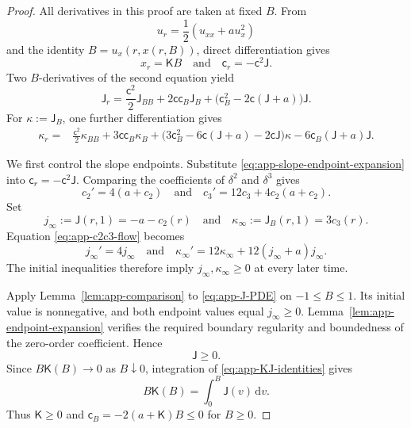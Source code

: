 \documentclass[10pt]{amsart}
\theoremstyle{definition}
\theoremstyle{remark}
\numberwithin{equation}{section}
\newcommand{\1}{\mathbf 1}
\newcommand{\dd}{\,\mathrm d}
\begin{document}
\begin{proof}
All derivatives in this proof are taken at fixed $B$.  From
\begin{equation*}
 u_r=\frac12(u_{xx}+au_x^2)
\end{equation*}
and the identity $B=u_x(r,x(r,B))$, direct differentiation gives
\begin{equation}
 x_r=\mathsf K B\quad\text{and}\quad \mathsf c_r=-\mathsf c^2\mathsf J.
 \label{eq:app-xC-flow}
\end{equation}
Two $B$-derivatives of the second equation yield
\begin{equation}
 \mathsf J_r=\frac{\mathsf c^2}{2}\mathsf J_{BB}+2\mathsf c\mathsf c_B\mathsf J_B
 +\bigl(\mathsf c_B^2-2\mathsf c(\mathsf J+a)\bigr)\mathsf J.
 \label{eq:app-J-PDE}
\end{equation}
For $\kappa:=\mathsf J_B$, one further differentiation gives
\begin{align}
 \kappa_r=&\frac{\mathsf c^2}{2}\kappa_{BB}+3\mathsf c\mathsf c_B\kappa_B
 +\bigl(3\mathsf c_B^2-6\mathsf c(\mathsf J+a)-2\mathsf c\mathsf J\bigr)\kappa
 -6\mathsf c_B(\mathsf J+a)\mathsf J.
 \label{eq:app-kappa-PDE}
\end{align}

We first control the slope endpoints.  Substitute \eqref{eq:app-slope-endpoint-expansion} into $\mathsf c_r=-\mathsf c^2\mathsf J$.  Comparing the coefficients of $\delta^2$ and $\delta^3$ gives
\begin{equation}
 c_2'=4(a+c_2)\quad\text{and}\quad
 c_3'=12c_3+4c_2(a+c_2).
 \label{eq:app-c2c3-flow}
\end{equation}
Set
\begin{equation*}
 j_\infty:=\mathsf J(r,1)=-a-c_2(r)\quad\text{and}\quad
 \kappa_\infty:=\mathsf J_B(r,1)=3c_3(r).
\end{equation*}
Equation \eqref{eq:app-c2c3-flow} becomes
\begin{equation}
 j_\infty'=4j_\infty\quad\text{and}\quad
 \kappa_\infty'=12\kappa_\infty
 +12(j_\infty+a)j_\infty.
 \label{eq:app-endpoint-flow}
\end{equation}
The initial inequalities therefore imply $j_\infty,\kappa_\infty\geq0$ at every later time.

Apply Lemma~\ref{lem:app-comparison} to \eqref{eq:app-J-PDE} on $-1\leq B\leq1$.  Its initial value is nonnegative, and both endpoint values equal $j_\infty\geq0$. Lemma~\ref{lem:app-endpoint-expansion} verifies the required boundary regularity and boundedness of the zero-order coefficient.  Hence
\begin{equation}
 \mathsf J\geq0.
 \label{eq:app-J-positive}
\end{equation}
Since $B\mathsf K(B)\to0$ as $B\downarrow0$, integration of \eqref{eq:app-KJ-identities} gives
\begin{equation}
 B\mathsf K(B)=\int_0^B\mathsf J(v)\dd v.
 \label{eq:app-K-average}
\end{equation}
Thus $\mathsf K\geq0$ and $\mathsf c_B=-2(a+\mathsf K)B\leq0$ for $B\geq0$.


\end{proof}
\end{document}
